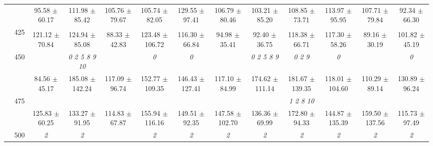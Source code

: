 \begin{table}[h]
{\begin{tabular}{
        ccccccccccccc}
 & & 95.58 $\pm$ 60.17& 111.98 $\pm$ 85.42& 105.76 $\pm$ 79.67& 105.74 $\pm$ 82.05& 129.55 $\pm$ 97.41& 106.79 $\pm$ 80.46& 103.21 $\pm$ 85.20& 108.85 $\pm$ 73.71& 113.97 $\pm$ 95.95& 107.71 $\pm$ 79.84& 92.34 $\pm$ 66.30 \\ 
 & \multirow{2}{*}{425}& \cellcolor[HTML]{EFEFEF} & \cellcolor[HTML]{EFEFEF} & \cellcolor[HTML]{EFEFEF} & \cellcolor[HTML]{EFEFEF} & \cellcolor[HTML]{EFEFEF} & \cellcolor[HTML]{EFEFEF} & \cellcolor[HTML]{EFEFEF} & \cellcolor[HTML]{EFEFEF} & \cellcolor[HTML]{EFEFEF} & \cellcolor[HTML]{EFEFEF} & \cellcolor[HTML]{EFEFEF}  \\ 
 & & \cellcolor[HTML]{EFEFEF} 121.12 $\pm$ 70.84& \cellcolor[HTML]{EFEFEF} 124.94 $\pm$ 85.08& \cellcolor[HTML]{EFEFEF} 88.33 $\pm$ 42.83& \cellcolor[HTML]{EFEFEF} 123.48 $\pm$ 106.72& \cellcolor[HTML]{EFEFEF} 116.30 $\pm$ 66.84& \cellcolor[HTML]{EFEFEF} 94.98 $\pm$ 35.41& \cellcolor[HTML]{EFEFEF} 92.40 $\pm$ 36.75& \cellcolor[HTML]{EFEFEF} 118.38 $\pm$ 66.71& \cellcolor[HTML]{EFEFEF} 117.30 $\pm$ 58.26& \cellcolor[HTML]{EFEFEF} 89.16 $\pm$ 30.19& \cellcolor[HTML]{EFEFEF} 101.82 $\pm$ 45.19 \\ 
 & \multirow{2}{*}{450}& & \textit{  0  2  5  8  9 10 }& & \textit{ 0 }& \textit{ 0 }& & \textit{ 0 2 5 8 9 }& \textit{ 0 2 9 }& \textit{ 0 }& & \textit{ 0 } \\ 
 & & 84.56 $\pm$ 45.17& 185.08 $\pm$ 142.24& 117.09 $\pm$ 96.74& 152.77 $\pm$ 109.35& 146.43 $\pm$ 127.41& 117.10 $\pm$ 84.99& 174.62 $\pm$ 111.14& 181.67 $\pm$ 139.35& 118.01 $\pm$ 104.60& 110.29 $\pm$ 89.14& 130.89 $\pm$ 96.24 \\ 
 & \multirow{2}{*}{475}& \cellcolor[HTML]{EFEFEF} & \cellcolor[HTML]{EFEFEF} & \cellcolor[HTML]{EFEFEF} & \cellcolor[HTML]{EFEFEF} & \cellcolor[HTML]{EFEFEF} & \cellcolor[HTML]{EFEFEF} & \cellcolor[HTML]{EFEFEF} & \cellcolor[HTML]{EFEFEF} \textit{  1  2  8 10 }& \cellcolor[HTML]{EFEFEF} & \cellcolor[HTML]{EFEFEF} & \cellcolor[HTML]{EFEFEF}  \\ 
 & & \cellcolor[HTML]{EFEFEF} 125.83 $\pm$ 60.25& \cellcolor[HTML]{EFEFEF} 133.27 $\pm$ 91.95& \cellcolor[HTML]{EFEFEF} 114.83 $\pm$ 67.87& \cellcolor[HTML]{EFEFEF} 155.94 $\pm$ 116.16& \cellcolor[HTML]{EFEFEF} 149.51 $\pm$ 92.35& \cellcolor[HTML]{EFEFEF} 147.58 $\pm$ 102.70& \cellcolor[HTML]{EFEFEF} 136.36 $\pm$ 69.99& \cellcolor[HTML]{EFEFEF} 172.80 $\pm$ 94.33& \cellcolor[HTML]{EFEFEF} 144.87 $\pm$ 135.39& \cellcolor[HTML]{EFEFEF} 159.50 $\pm$ 137.56& \cellcolor[HTML]{EFEFEF} 115.73 $\pm$ 97.49 \\ 
 & \multirow{2}{*}{500}& \textit{ 2 }& \textit{ 2 }& & \textit{ 2 }& \textit{ 2 }& \textit{ 2 }& \textit{ 2 }& \textit{ 2 }& \textit{ 2 }& \textit{ 2 }& \textit{ 2 } \\ 

\end{tabular}}
\end{table}
